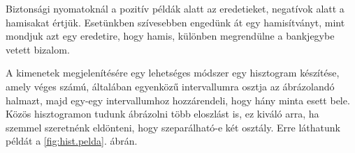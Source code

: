 %


Biztonsági nyomatoknál a pozitív példák alatt az eredetieket, negatívok alatt a hamisakat értjük.
Esetünkben szívesebben engedünk át egy hamisítványt, mint mondjuk  azt egy eredetire, hogy hamis,
különben megrendülne a bankjegybe vetett bizalom.




A kimenetek megjelenítésére egy lehetséges módszer egy hisztogram készítése, amely véges számú, általában egyenközű intervallumra osztja az ábrázolandó halmazt, majd egy-egy intervallumhoz hozzárendeli, hogy hány minta esett bele. Közös hisztogramon tudunk ábrázolni több eloszlást is, ez kiváló arra, ha szemmel szeretnénk eldönteni, hogy szeparálható-e két osztály. Erre láthatunk példát a \ref{fig:hist.pelda}. ábrán.



%
%

